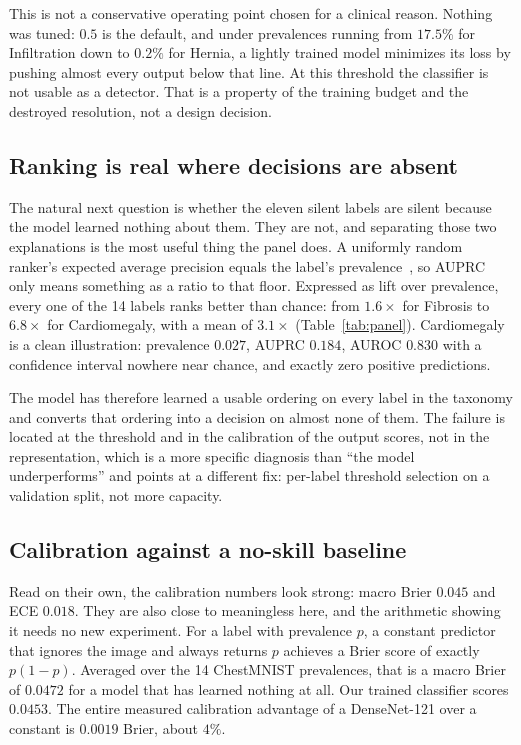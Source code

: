 \documentclass[conference]{IEEEtran}
\begin{document}
This is not a conservative operating point chosen for a clinical reason. Nothing
was tuned: $0.5$ is the default, and under prevalences running from $17.5\%$ for
Infiltration down to $0.2\%$ for Hernia, a lightly trained model minimizes its loss
by pushing almost every output below that line. At this threshold the classifier is
not usable as a detector. That is a property of the training budget and the
destroyed resolution, not a design decision.

\subsection{Ranking is real where decisions are absent}
\label{sec:auprc}
The natural next question is whether the eleven silent labels are silent because
the model learned nothing about them. They are not, and separating those two
explanations is the most useful thing the panel does. A uniformly random ranker's
expected average precision equals the label's
prevalence~\cite{davis2006pr,saito2015prc}, so AUPRC only means something as a ratio
to that floor. Expressed as lift over prevalence, every one of the 14 labels ranks
better than chance: from $1.6\times$ for Fibrosis to $6.8\times$ for Cardiomegaly,
with a mean of $3.1\times$ (Table~\ref{tab:panel}). Cardiomegaly is a clean
illustration: prevalence $0.027$, AUPRC $0.184$, AUROC $0.830$ with a confidence
interval nowhere near chance, and exactly zero positive predictions.

The model has therefore learned a usable ordering on every label in the taxonomy
and converts that ordering into a decision on almost none of them. The failure is
located at the threshold and in the calibration of the output scores, not in the
representation, which is a more specific diagnosis than ``the model underperforms''
and points at a different fix: per-label threshold selection on a validation split,
not more capacity.

\subsection{Calibration against a no-skill baseline}
\label{sec:calib}
Read on their own, the calibration numbers look strong: macro Brier $0.045$ and ECE
$0.018$. They are also close to meaningless here, and the arithmetic showing it
needs no new experiment. For a label with prevalence $p$, a constant predictor that
ignores the image and always returns $p$ achieves a Brier score of exactly
$p(1-p)$. Averaged over the 14 ChestMNIST prevalences, that is a macro Brier of
$\mathbf{0.0472}$ for a model that has learned nothing at all. Our trained
classifier scores $\mathbf{0.0453}$. The entire measured calibration advantage of a
DenseNet-121 over a constant is $0.0019$ Brier, about $4\%$.
\end{document}
